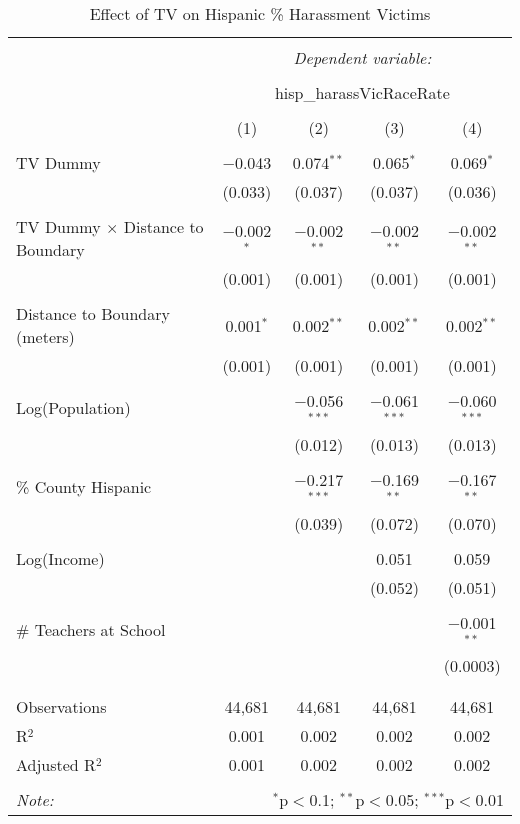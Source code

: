 
\begin{table}[!htbp] \centering 
  \caption{Effect of TV on Hispanic \% Harassment Victims} 
  \label{} 
\begin{tabular}{@{\extracolsep{-2pt}}lcccc} 
\\[-1.8ex]\hline 
\hline \\[-1.8ex] 
 & \multicolumn{4}{c}{\textit{Dependent variable:}} \\ 
\cline{2-5} 
\\[-1.8ex] & \multicolumn{4}{c}{hisp\_harassVicRaceRate} \\ 
\\[-1.8ex] & (1) & (2) & (3) & (4)\\ 
\hline \\[-1.8ex] 
 TV Dummy & $-$0.043 & 0.074$^{**}$ & 0.065$^{*}$ & 0.069$^{*}$ \\ 
  & (0.033) & (0.037) & (0.037) & (0.036) \\ 
  & & & & \\ 
 TV Dummy $\times$ Distance to Boundary & $-$0.002$^{*}$ & $-$0.002$^{**}$ & $-$0.002$^{**}$ & $-$0.002$^{**}$ \\ 
  & (0.001) & (0.001) & (0.001) & (0.001) \\ 
  & & & & \\ 
 Distance to Boundary (meters) & 0.001$^{*}$ & 0.002$^{**}$ & 0.002$^{**}$ & 0.002$^{**}$ \\ 
  & (0.001) & (0.001) & (0.001) & (0.001) \\ 
  & & & & \\ 
 Log(Population) &  & $-$0.056$^{***}$ & $-$0.061$^{***}$ & $-$0.060$^{***}$ \\ 
  &  & (0.012) & (0.013) & (0.013) \\ 
  & & & & \\ 
 \% County Hispanic &  & $-$0.217$^{***}$ & $-$0.169$^{**}$ & $-$0.167$^{**}$ \\ 
  &  & (0.039) & (0.072) & (0.070) \\ 
  & & & & \\ 
 Log(Income) &  &  & 0.051 & 0.059 \\ 
  &  &  & (0.052) & (0.051) \\ 
  & & & & \\ 
 \# Teachers at School &  &  &  & $-$0.001$^{**}$ \\ 
  &  &  &  & (0.0003) \\ 
  & & & & \\ 
\hline \\[-1.8ex] 
Observations & 44,681 & 44,681 & 44,681 & 44,681 \\ 
R$^{2}$ & 0.001 & 0.002 & 0.002 & 0.002 \\ 
Adjusted R$^{2}$ & 0.001 & 0.002 & 0.002 & 0.002 \\ 
\hline 
\hline \\[-1.8ex] 
\textit{Note:}  & \multicolumn{4}{r}{$^{*}$p$<$0.1; $^{**}$p$<$0.05; $^{***}$p$<$0.01} \\ 
\end{tabular} 
\end{table} 
